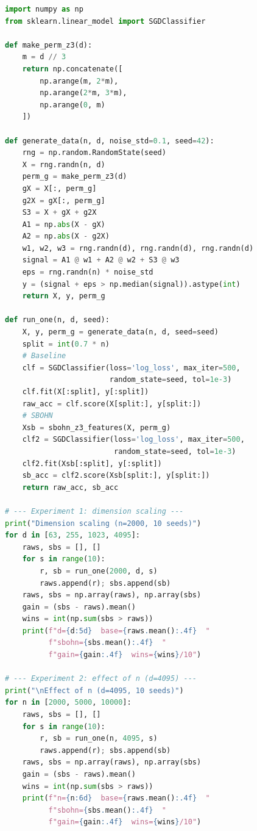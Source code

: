 \documentclass[11pt,a4paper]{report}
\begin{document}
\label{app:ch5-lst7}
\begin{lstlisting}[language=Python]
import numpy as np
from sklearn.linear_model import SGDClassifier

def make_perm_z3(d):
    m = d // 3
    return np.concatenate([
        np.arange(m, 2*m),
        np.arange(2*m, 3*m),
        np.arange(0, m)
    ])

def generate_data(n, d, noise_std=0.1, seed=42):
    rng = np.random.RandomState(seed)
    X = rng.randn(n, d)
    perm_g = make_perm_z3(d)
    gX = X[:, perm_g]
    g2X = gX[:, perm_g]
    S3 = X + gX + g2X
    A1 = np.abs(X - gX)
    A2 = np.abs(X - g2X)
    w1, w2, w3 = rng.randn(d), rng.randn(d), rng.randn(d)
    signal = A1 @ w1 + A2 @ w2 + S3 @ w3
    eps = rng.randn(n) * noise_std
    y = (signal + eps > np.median(signal)).astype(int)
    return X, y, perm_g

def run_one(n, d, seed):
    X, y, perm_g = generate_data(n, d, seed=seed)
    split = int(0.7 * n)
    # Baseline
    clf = SGDClassifier(loss='log_loss', max_iter=500,
                        random_state=seed, tol=1e-3)
    clf.fit(X[:split], y[:split])
    raw_acc = clf.score(X[split:], y[split:])
    # SBOHN
    Xsb = sbohn_z3_features(X, perm_g)
    clf2 = SGDClassifier(loss='log_loss', max_iter=500,
                         random_state=seed, tol=1e-3)
    clf2.fit(Xsb[:split], y[:split])
    sb_acc = clf2.score(Xsb[split:], y[split:])
    return raw_acc, sb_acc

# --- Experiment 1: dimension scaling ---
print("Dimension scaling (n=2000, 10 seeds)")
for d in [63, 255, 1023, 4095]:
    raws, sbs = [], []
    for s in range(10):
        r, sb = run_one(2000, d, s)
        raws.append(r); sbs.append(sb)
    raws, sbs = np.array(raws), np.array(sbs)
    gain = (sbs - raws).mean()
    wins = int(np.sum(sbs > raws))
    print(f"d={d:5d}  base={raws.mean():.4f}  "
          f"sbohn={sbs.mean():.4f}  "
          f"gain={gain:.4f}  wins={wins}/10")

# --- Experiment 2: effect of n (d=4095) ---
print("\nEffect of n (d=4095, 10 seeds)")
for n in [2000, 5000, 10000]:
    raws, sbs = [], []
    for s in range(10):
        r, sb = run_one(n, 4095, s)
        raws.append(r); sbs.append(sb)
    raws, sbs = np.array(raws), np.array(sbs)
    gain = (sbs - raws).mean()
    wins = int(np.sum(sbs > raws))
    print(f"n={n:6d}  base={raws.mean():.4f}  "
          f"sbohn={sbs.mean():.4f}  "
          f"gain={gain:.4f}  wins={wins}/10")
\end{lstlisting}
\end{document}
